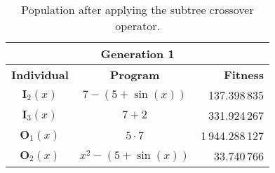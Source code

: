 \begin{table}[ht!]
  \centering
  \begin{tabular}{c|c|r}
    \multicolumn{3}{c}{\textbf{Generation 1}}	\\
    \hline
    \hline
    \textbf{Individual}	& \textbf{Program}	& \textbf{Fitness}	\\
    \hline
    \(\mathbf{I}_2(x)\)	& \(7 - (5 + \sin(x))\)	& 137.398\,835	\\
    \(\mathbf{I}_3(x)\)	& \(7 + 2\)	& 331.924\,267	\\
    \(\mathbf{O}_1(x)\)	& \(5 \cdot 7\)	& 1\,944.288\,127	\\
    \(\mathbf{O}_2(x)\)	& \(x^2 - (5 + \sin(x))\)	& 33.740\,766	\\
  \end{tabular}
  \caption{Population after applying the subtree crossover operator.}
  \label{tab:bg:gp:variation:crossover:subtree:fitness}
\end{table}